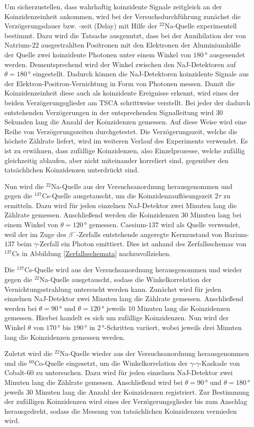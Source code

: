 Um sicherzustellen, dass wahrhaftig koinzidente Signale zeitgleich an der Koinzidenzeinheit ankommen, wird bei der Versuchsdurchführung zunächst die Verzögerungsdauer bzw. -zeit (Delay) mit Hilfe der $^{22}$Na-Quelle experimentell bestimmt.
Dazu wird die Tatsache ausgenutzt, dass bei der Annihilation der von Natrium-$22$ ausgestrahlten Positronen mit den Elektronen der Aluminiumhülle der Quelle zwei koinzidente Photonen unter einem Winkel von $180\,$° ausgesendet werden.
Dementsprechend wird der Winkel zwischen den NaJ-Detektoren auf $\theta =180\,$° eingestellt.
Dadurch können die NaJ-Detektoren koinzidente Signale aus der Elektron-Positron-Vernichtung in Form von Photonen messen.
Damit die Koinzidenzeinheit diese auch als koinzidente Ereignisse erkennt, wird eines der beiden Verzögerungsglieder am TSCA schrittweise verstellt.
Bei jeder der dadurch entstehenden Verzögerungen in der entsprechenden Signalleitung wird $30$ Sekunden lang die Anzahl der Koinzidenzen gemessen.
Auf diese Weise wird eine Reihe von Verzögerungszeiten durchgetestet.
Die Verzögerungszeit, welche die höchste Zählrate liefert, wird im weiteren Verlauf des Experiments verwendet.
Es ist zu erwähnen, dass zufällige Koinzidenzen, also Einzelprozesse, welche zufällig gleichzeitig ablaufen, aber nicht miteinander korreliert sind, gegenüber den tatsächlichen Koinzidenzen unterdrückt sind.

Nun wird die $^{22}$Na-Quelle aus der Versuchsanordnung herausgenommen und gegen die $^{137}$Cs-Quelle ausgetauscht, um die Koinzidenzauflösungszeit $2\tau$ zu ermitteln.
Dazu wird für jeden einzelnen NaJ-Detektor zwei Minuten lang die Zählrate gemessen.
Anschließend werden die Koinzidenzen $30$ Minuten lang bei einem Winkel von $\theta =120\,$° gemessen.
Caesium-$137$ wird als Quelle verwendet, weil der im Zuge des $\beta^{-}$-Zerfalls entstehende angeregte Kernzustand von Barium-$137$ beim $\gamma$-Zerfall ein Photon emittiert.
Dies ist anhand des Zerfallsschemas von $^{137}$Cs in Abbildung \ref{Zerfallsschemata} nachzuvollziehen.

Die $^{137}$Cs-Quelle wird aus der Versuchsanordnung herausgenommen und wieder gegen die $^{22}$Na-Quelle ausgetauscht, sodass die Winkelkorrelation der Vernichtungsstrahlung untersucht werden kann.
Zunächst wird für jeden einzelnen NaJ-Detektor zwei Minuten lang die Zählrate gemessen.
Anschließend werden bei $\theta =90\,$° und $\theta =120\,$° jeweils $10$ Minuten lang die Koinzidenzen gemessen.
Hierbei handelt es sich um zufällige Koinzidenzen.
Nun wird der Winkel $\theta$ von $170\,$° bis $190\,$° in $2\,$°-Schritten variiert, wobei jeweils drei Minuten lang die Koinzidenzen gemessen werden.

Zuletzt wird die $^{22}$Na-Quelle wieder aus der Versuchsanordnung herausgenommen und die $^{60}$Co-Quelle eingesetzt, um die Winkelkorrelation der $\gamma$-$\gamma$-Kaskade von Cobalt-$60$ zu untersuchen.
Dazu wird für jeden einzelnen NaJ-Detektor zwei Minuten lang die Zählrate gemessen.
Anschließend wird bei $\theta =90\,$° und $\theta =180\,$° jeweils $30$ Minuten lang die Anzahl der Koinzidenzen registriert.
Zur Bestimmung der zufälligen Koinzidenzen wird eines der Verzögerungsglieder bis zum Anschlag herausgedreht, sodass die Messung von tatsächlichen Koinzidenzen vermieden wird.